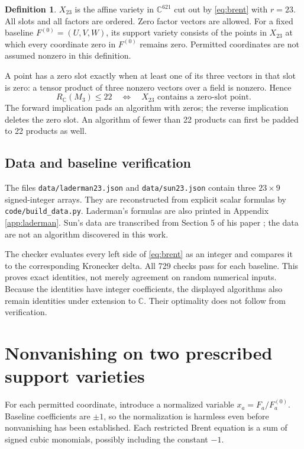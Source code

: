 \documentclass[11pt,letterpaper]{article}
\theoremstyle{definition}\newtheorem{definition}[theorem]{Definition}
\theoremstyle{remark}\newtheorem{remark}[theorem]{Remark}
\newcommand{\CC}{\mathbb C}\newcommand{\ZZ}{\mathbb Z}\newcommand{\QQ}{\mathbb Q}
\newcommand{\file}[1]{\nolinkurl{#1}}
\begin{document}
\begin{definition}
$X_{23}$ is the affine variety in $\CC^{621}$ cut out by
\eqref{eq:brent} with $r=23$. All slots and all factors are ordered.
Zero factor vectors are allowed. For a fixed baseline $F^{(0)}=(U,V,W)$,
its support variety consists of the points in $X_{23}$ at which every
coordinate zero in $F^{(0)}$ remains zero. Permitted coordinates are not
assumed nonzero in this definition.
\end{definition}

A point has a zero slot exactly when at least one of its three vectors in
that slot is zero: a tensor product of three nonzero vectors over a field
is nonzero. Hence
\begin{equation}\label{eq:zeroequiv}
R_{\CC}(M_3)\le22
\quad\Longleftrightarrow\quad
X_{23}\text{ contains a zero-slot point}.
\end{equation}
The forward implication pads an algorithm with zeros; the reverse
implication deletes the zero slot. An algorithm of fewer than 22 products
can first be padded to 22 products as well.

\subsection{Data and baseline verification}
The files \file{data/laderman23.json} and \file{data/sun23.json} contain three
$23\times9$ signed-integer arrays. They are reconstructed from explicit
scalar formulas by \file{code/build_data.py}. Laderman's formulas are also
printed in Appendix \ref{app:laderman}. Sun's data are transcribed from
Section 5 of his paper \cite{sun}; the data are not an algorithm discovered
in this work.

The checker evaluates every left side of \eqref{eq:brent} as an integer and
compares it to the corresponding Kronecker delta. All 729 checks pass for
each baseline. This proves exact identities, not merely agreement on
random numerical inputs. Because the identities have integer coefficients,
the displayed algorithms also remain identities under extension to $\CC$.
Their optimality does not follow from verification.

\section{Nonvanishing on two prescribed support varieties}
\label{sec:forcing}
For each permitted coordinate, introduce a normalized variable
$x_a=F_a/F_a^{(0)}$. Baseline coefficients are $\pm1$, so the normalization
is harmless even before nonvanishing has been established.
Each restricted Brent equation is a sum of signed cubic monomials, possibly
including the constant $-1$.
\end{document}
